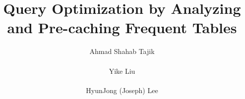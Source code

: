 \documentclass{sig-alternate}
\begin{document}
%

\title{Query Optimization by Analyzing and Pre-caching Frequent Tables}

 \author{
\alignauthor
Ahmad Shahab Tajik\\
       \\
\alignauthor Yike Liu\\
       \\
\alignauthor HyunJong (Joseph) Lee\\
       \\
}
\maketitle










\end{document}
